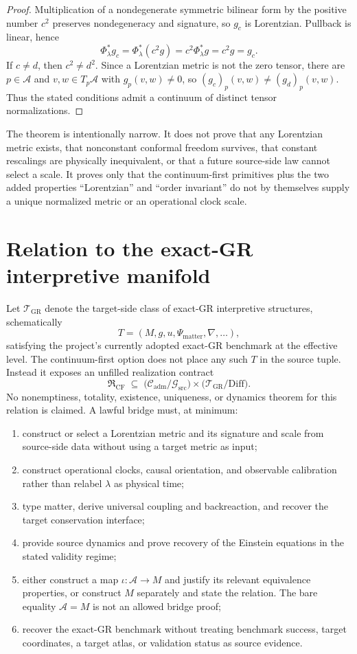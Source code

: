 \documentclass[11pt]{article}
\newcommand{\A}{\mathcal A}
\newcommand{\C}{\mathcal C}
\newcommand{\G}{\mathcal G}
\newcommand{\TGR}{\mathcal T_{\mathrm{GR}}}
\begin{document}
\begin{proof}
Multiplication of a nondegenerate symmetric bilinear form by the positive
number $c^2$ preserves nondegeneracy and signature, so $g_c$ is Lorentzian.
Pullback is linear, hence
\[
  \Phi_\lambda^*g_c
  =\Phi_\lambda^*(c^2g)
  =c^2\Phi_\lambda^*g
  =c^2g=g_c.
\]
If $c\ne d$, then $c^2\ne d^2$. Since a Lorentzian metric is not the zero
tensor, there are $p\in\A$ and $v,w\in T_p\A$ with
$g_p(v,w)\ne0$, so $(g_c)_p(v,w)\ne(g_d)_p(v,w)$. Thus the stated
conditions admit a continuum of distinct tensor normalizations.
\end{proof}

The theorem is intentionally narrow. It does not prove that any Lorentzian
metric exists, that nonconstant conformal freedom survives, that constant
rescalings are physically inequivalent, or that a future source-side law
cannot select a scale. It proves only that the continuum-first primitives plus
the two added properties ``Lorentzian'' and ``order invariant'' do not by
themselves supply a unique normalized metric or an operational clock scale.

\section{Relation to the exact-GR interpretive manifold}

Let $\TGR$ denote the target-side class of exact-GR interpretive structures,
schematically
\[
  T=(M,g,u,\Psi_{\mathrm{matter}},\nabla,\ldots),
\]
satisfying the project's currently adopted exact-GR benchmark at the effective level. The
continuum-first option does not place any such $T$ in the source tuple.
Instead it exposes an unfilled realization contract
\[
 \mathfrak R_{\mathrm{CF}}
 \;\subseteq\;
 \bigl(\C_{\mathrm{adm}}/\G_{\mathrm{src}}\bigr)
 \times \bigl(\TGR/\mathrm{Diff}\bigr).
\]
No nonemptiness, totality, existence, uniqueness, or dynamics theorem for this
relation is claimed. A lawful bridge must, at minimum:
\begin{enumerate}[label=(B\arabic*)]
  \item construct or select a Lorentzian metric and its signature and scale
  from source-side data without using a target metric as input;
  \item construct operational clocks, causal orientation, and observable
  calibration rather than relabel $\lambda$ as physical time;
  \item type matter, derive universal coupling and backreaction, and recover
  the target conservation interface;
  \item provide source dynamics and prove recovery of the Einstein equations
  in the stated validity regime;
  \item either construct a map $\iota:\A\to M$ and justify its relevant
  equivalence properties, or construct $M$ separately and state the relation.
  The bare equality $\A=M$ is not an allowed bridge proof;
  \item recover the exact-GR benchmark without treating benchmark success,
  target coordinates, a target atlas, or validation status as source evidence.
\end{enumerate}
\end{document}

